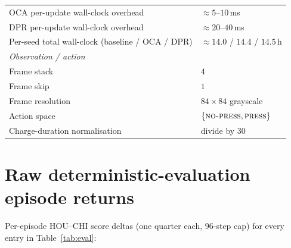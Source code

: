 \documentclass{article}
\begin{document}
\begin{table}[h]
\begin{tabular}{ll}
    OCA per-update wall-clock overhead            & $\approx 5$--$10$\,ms \\
    DPR per-update wall-clock overhead            & $\approx 20$--$40$\,ms \\
    Per-seed total wall-clock (baseline / OCA / DPR) & $\approx 14.0$ / $14.4$ / $14.5$\,h \\
    \midrule
    \multicolumn{2}{l}{\emph{Observation / action}} \\
    Frame stack                                   & $4$ \\
    Frame skip                                    & $1$ \\
    Frame resolution                              & $84 \times 84$ grayscale \\
    Action space                                  & $\{\textsc{no-press}, \textsc{press}\}$ \\
    Charge-duration normalisation                 & divide by $30$ \\
    \bottomrule
  \end{tabular}
\end{table}

\section{Raw deterministic-evaluation episode returns}
\label{app:eval-raw}

Per-episode HOU--CHI score deltas (one quarter each, 96-step cap)
for every entry in Table~\ref{tab:eval}:
\end{document}
